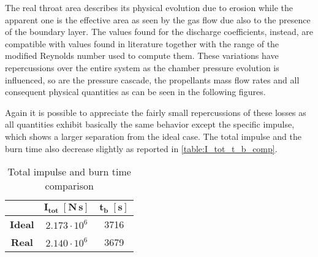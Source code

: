 
The real throat area describes its physical evolution due to erosion while the apparent one is the effective area as seen by the gas flow due also to the presence of the boundary layer. The values found for the discharge coefficients, instead, are compatible with values found in literature together with the range of the modified Reynolds number used to compute them. \mref These variations have repercussions over the entire system as the chamber pressure evolution is influenced, so are the pressure cascade, the propellants mass flow rates and all consequent physical quantities as can be seen in the following figures.  


Again it is possible to appreciate the fairly small repercussions of these losses as all quantities exhibit basically the same behavior except the specific impulse, which shows a larger separation from the ideal case. The total impulse and the burn time also decrease slightly as reported in \autoref{table:I_tot_t_b_comp}.

\begin{table}[H]
    \renewcommand{\arraystretch}{1.25}
    \centering
    \begin{tabular}{|c|c|c|}
        \hline
        & $\boldsymbol{I_{tot} \; [\textbf{N} \, \textbf{s}]}$ & $\boldsymbol{t_b \; [\textbf{s}]}$ \\
        \hline
        \hline
        \textbf{Ideal} & $2.173 \cdot 10^6$ & 3716 \\
        \hline
        \textbf{Real} & $2.140 \cdot 10^6$ & 3679 \\
        \hline
    \end{tabular}
    \caption{Total impulse and burn time comparison}
    \label{table:I_tot_t_b_comp}
\end{table}
